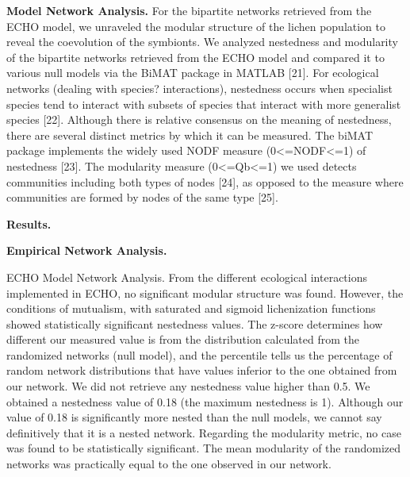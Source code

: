 \documentclass[runningheads,a4paper]{llncs}
\begin{document}
\textbf{Model Network Analysis.} 
For the bipartite networks retrieved from the ECHO model, we unraveled the modular structure of the lichen population to reveal the coevolution of the symbionts. We analyzed nestedness and modularity of the bipartite networks retrieved from the ECHO model and compared it to various null models via the BiMAT package in MATLAB [21]. For ecological networks (dealing with species? interactions), nestedness occurs when specialist species tend to interact with subsets of species that interact with more generalist species [22]. Although there is relative consensus on the meaning of nestedness, there are several distinct metrics by which it can be measured. The biMAT package implements the widely used NODF measure (0<=NODF<=1) of nestedness [23]. The modularity measure (0<=Qb<=1) we used detects communities including both types of nodes [24], as opposed to the measure where communities are formed by nodes of the same type [25]. 

\textbf{Results.} 

\textbf{Empirical Network Analysis. }

ECHO Model Network Analysis. 
From the different ecological interactions implemented in ECHO, no significant modular structure was found. However, the conditions of mutualism, with saturated and sigmoid lichenization functions showed statistically significant nestedness values. The z-score determines how different our measured value is from the distribution calculated from the randomized networks (null model), and the percentile tells us the percentage of random network distributions that have values inferior to the one obtained from our network. We did not retrieve any nestedness value higher than 0.5. We obtained a nestedness value of 0.18 (the maximum nestedness is 1). Although our value of 0.18 is significantly more nested than the null models, we cannot say definitively that it is a nested network. Regarding the modularity metric, no case was found to be statistically significant. The mean modularity of the randomized networks was practically equal to the one observed in our network. 
\end{document}
